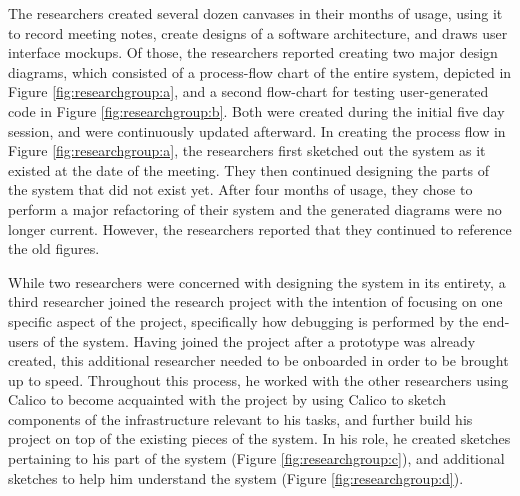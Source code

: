 The researchers created several dozen canvases in their months of usage, using it to record meeting notes, create designs of a software architecture, and draws user interface mockups. Of those, the researchers reported creating two major design diagrams, which consisted of a process-flow chart of the entire system, depicted in Figure \ref{fig:researchgroup:a}, and a second flow-chart for testing user-generated code in Figure \ref{fig:researchgroup:b}. Both were created during the initial five day session, and were continuously updated afterward. In creating the process flow in Figure \ref{fig:researchgroup:a}, the researchers first sketched out the system as it existed at the date of the meeting. They then continued designing the parts of the system that did not exist yet. After four months of usage, they chose to perform a major refactoring of their system and the generated diagrams were no longer current. However, the researchers reported that they continued to reference the old figures.


%
%
%

While two researchers were concerned with designing the system in its entirety, a third researcher joined the research project with the intention of focusing on one specific aspect of the project, specifically how debugging is performed by the end-users of the system. Having joined the project after a prototype was already created, this additional researcher needed to be onboarded in order to be brought up to speed. Throughout this process, he worked with the other researchers using Calico to become acquainted with the project by using Calico to sketch components of the infrastructure relevant to his tasks, and further build his project on top of the existing pieces of the system. In his role, he created sketches pertaining to his part of the system (Figure \ref{fig:researchgroup:c}), and additional sketches to help him understand the system (Figure \ref{fig:researchgroup:d}).

